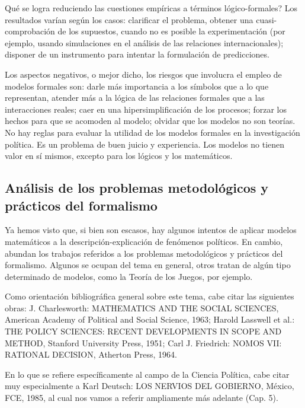 \documentclass[
]{book}
\begin{document}
Qué se logra reduciendo las cuestiones empíricas a términos lógico-formales? Los resultados varían según los casos: clarificar el problema, obtener una cuasi-comprobación de los supuestos, cuando no es posible la experimentación (por ejemplo, usando simulaciones en el análisis de las relaciones internacionales); disponer de un instrumento para intentar la formulación de predicciones.

Los aspectos negativos, o mejor dicho, los riesgos que involucra el empleo de modelos formales son: darle más importancia a los símbolos que a lo que representan, atender más a la lógica de las relaciones formales que a las interacciones reales; caer en una hipersimplificación de los procesos; forzar los hechos para que se acomoden al modelo; olvidar que los modelos no son teorías. No hay reglas para evaluar la utilidad de los modelos formales en la investigación política. Es un problema de buen juicio y experiencia. Los modelos no tienen valor en sí mismos, excepto para los lógicos y los matemáticos.

\hypertarget{anuxe1lisis-de-los-problemas-metodoluxf3gicos-y-pruxe1cticos-del-formalismo}{%
\subsection*{Análisis de los problemas metodológicos y prácticos del formalismo}\label{anuxe1lisis-de-los-problemas-metodoluxf3gicos-y-pruxe1cticos-del-formalismo}}

Ya hemos visto que, si bien son escasos, hay algunos intentos de aplicar modelos matemáticos a la descripción-explicación de fenómenos políticos. En cambio, abundan los trabajos referidos a los problemas metodológicos y prácticos del formalismo. Algunos se ocupan del tema en general, otros tratan de algún tipo determinado de modelos, como la Teoría de los Juegos, por ejemplo.

Como orientación bibliográfica general sobre este tema, cabe citar las siguientes obras: J. Charlesworth: MATHEMATICS AND THE SOCIAL SCIENCES, American Academy of Political and Social Science, 1963; Harold Lasswell et al.: THE POLICY SCIENCES: RECENT DEVELOPMENTS IN SCOPE AND METHOD, Stanford University Press, 1951; Carl J. Friedrich: NOMOS VII: RATIONAL DECISION, Atherton Press, 1964.

En lo que se refiere específicamente al campo de la Ciencia Política, cabe citar muy especialmente a Karl Deutsch: LOS NERVIOS DEL GOBIERNO, México, FCE, 1985, al cual nos vamos a referir ampliamente más adelante (Cap. 5).
\end{document}
